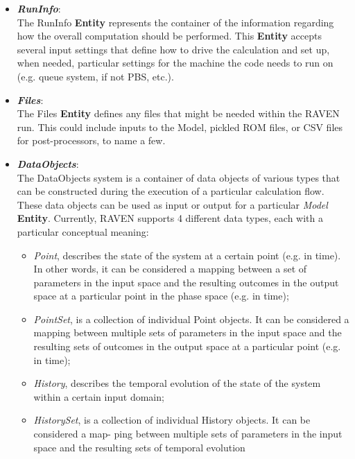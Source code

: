 \begin{itemize}
  \item \textit{\textbf{RunInfo}}:
    \\The RunInfo \textbf{Entity} represents the container of the information regarding how the overall computation should
      be performed. This \textbf{Entity}  accepts several input settings that define how to drive the calculation and set up,
      when needed, particular settings for the machine the code needs to run on (e.g. queue system, if not PBS, etc.).
  \item \textit{\textbf{Files}}:
  \\ The Files \textbf{Entity}  defines any files that might be needed within the RAVEN run. This could include inputs to the
      Model, pickled ROM files, or CSV files for post-processors, to name a few.
  \item \textit{\textbf{DataObjects}}:
    \\The DataObjects system is a container of data objects of various types that can be constructed during the execution of
     a particular calculation flow. These data objects can be used as input or output for a particular \textit{Model}
     \textbf{Entity}. Currently, RAVEN supports 4 different data types, each with a particular conceptual meaning:
     \begin{itemize}
        \item \textit{Point}, describes the state of the system at a certain point (e.g. in time). In other words, it can be
                                       considered a mapping between a set of parameters in the input space and the resulting
                                       outcomes in the output space at a particular point in the phase space (e.g. in time);
        \item \textit{PointSet}, is a collection of individual Point objects. It can be considered a mapping between multiple
                                            sets of parameters in the input space and the resulting sets of outcomes in the output space
                                            at a particular point (e.g. in time);
        \item \textit{History},  describes the temporal evolution of the state of the system within a certain input domain;
        \item \textit{HistorySet}, is a collection of individual History objects. It can be considered a map- ping between
                                               multiple sets of parameters in the input space and the resulting sets of temporal evolution

\end{itemize}
\end{itemize}
